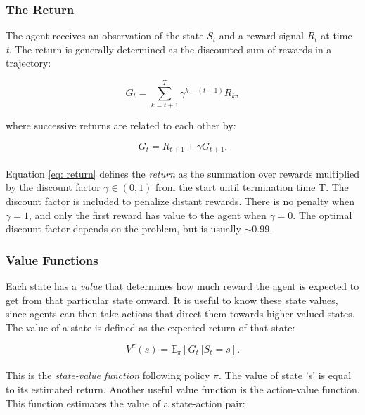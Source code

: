 \subsubsection*{The Return}
The agent receives an observation of the state $S_t$ and a reward signal $R_t$ at time \textit{t}. The return is generally determined as the discounted sum of rewards in a trajectory:

\begin{equation}
    G_t = \sum_{k=t+1}^{T} \gamma^{k-(t+1)} R_k,
    \label{eq: return}
\end{equation}

\noindent
where successive returns are related to each other by:

\begin{equation}
    G_t = R_{t+1} + \gamma G_{t+1}.    
    \label{eq: return sequence}
\end{equation}
\\[-3mm]
\noindent
Equation \ref{eq: return} defines the \textit{return} as the summation over rewards multiplied by the discount factor $\gamma \in (0,1)$ from the start until termination time T. The discount factor is included to penalize distant rewards. There is no penalty when $\gamma = 1$, and only the first reward has value to the agent when $\gamma = 0$. The optimal discount factor depends on the problem, but is usually $\sim$0.99. 




\subsubsection{Value Functions}
Each state has a \textit{value} that determines how much reward the agent is expected to get from that particular state onward. It is useful to know these state values, since agents can then take actions that direct them towards higher valued states. The value of a state is defined as the expected return of that state:

\begin{equation}
    \label{eq: state value function}
    V^\pi(s) = \mathbb{E}_\pi[G_t\ |S_t = s].
\end{equation}
\\[-3mm]
\noindent
This is the \textit{state-value function} following policy $\pi$. The value of state 's' is equal to its estimated return. Another useful value function is the action-value function. This function estimates the value of a state-action pair:

